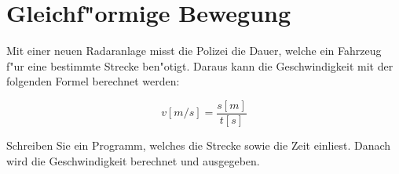 \documentclass[a4paper,10pt]{article}
\begin{document}
\section{Gleichf"ormige Bewegung}
Mit einer neuen Radaranlage misst die Polizei die Dauer, welche ein Fahrzeug f"ur eine bestimmte
Strecke ben"otigt. Daraus kann die Geschwindigkeit mit der folgenden Formel berechnet werden:

\begin{displaymath}
v [m/s] = \frac{s[m]}{t[s]}
\end{displaymath}

Schreiben Sie ein Programm, welches die Strecke sowie die Zeit einliest. Danach wird die Geschwindigkeit
berechnet und ausgegeben.
\end{document}

